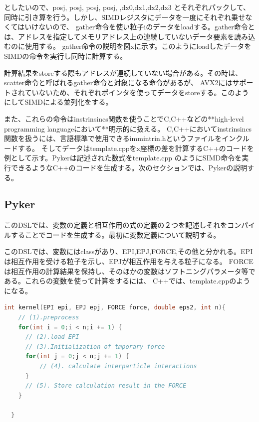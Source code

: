 \documentclass{jarticle}
\begin{document}
としたいので、\lparen pos\lbrack  j\rbrack {}\rbrack , pos\lbrack  j\rbrack {}\rbrack , pos\lbrack  j\rbrack {}\rbrack , pos\lbrack  j\rbrack {}\rparen, \lparen
,\lparen dx0,dx1,dx2,dx3 \rparen とそれぞれパックして、同時に引き算を行う。しかし、SIMDレジスタにデータを一度にそれぞれ乗せなくてはいけないので、
gather命令を使い粒子iのデータをloadする。gather命令とは、アドレスを指定してメモリアドレス上の連続していないデータ要素を読み込むのに使用する。
gather命令の説明を図xに示す。このようにloadしたデータをSIMDの命令を実行し同時に計算する。


計算結果をstoreする際もアドレスが連続していない場合がある。その時は、scatter命令と呼ばれるgather命令と対象になる命令があるが、
AVX2にはサポートされていないため、それぞれポインタを使ってデータをstoreする。このようにしてSIMDによる並列化をする。

また、これらの命令はinstrinsincs関数を使うことでC,C++などの**high-level programming languageにおいて**明示的に扱える。
C,C++においてinstrinsincs関数を扱うには、言語標準で使用できるimmintrin.hというファイルをインクルードする。
そしてデータはtemplate.cppをx座標の差を計算するC++のコードを例として示す。Pykerは記述された数式をtemplate.cpp
のようにSIMD命令を実行できるようなC++のコードを生成する。次のセクションでは、Pykerの説明する。


\subsection{Pyker}
このDSLでは、変数の定義と相互作用の式の定義の２つを記述しそれをコンパイルすることでコードを生成する。最初に変数定義について説明する。

このDSLでは、変数にはclassがあり、EPI,EPJ,FORCE,その他と分かれる。EPIは相互作用を受ける粒子を示し、EPJが相互作用を与える粒子になる。
FORCEは相互作用の計算結果を保持し、そのほかの変数はソフトニングパラメータ等である。これらの変数を使って計算をするには、
C++では、template.cppのようになる。


\begin{lstlisting}[frame=single, caption=template.cpp, language=c++]
  int kernel(EPI epi, EPJ epj, FORCE force, double eps2, int n){
    // (1).preprocess
    for(int i = 0;i < n;i += 1) {
      // (2).load EPI 
      // (3).Initialization of tmporary force
      for(int j = 0;j < n;j += 1) {
          // (4). calculate interparticle interactions
      }
      // (5). Store calculation result in the FORCE
    }
  
  }
  \end{lstlisting}
\end{document}
